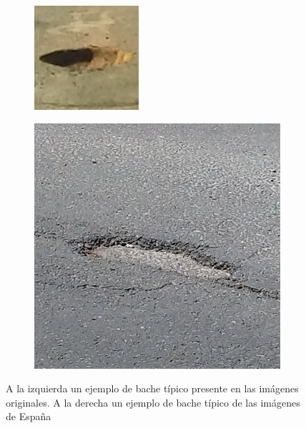 \begin{figure}[H]
	\centering
	\begin{subfigure}[h]{0.45\linewidth}
		\includegraphics[width=\linewidth]{images/pothole_diff_orig.png}
	\end{subfigure}
	\begin{subfigure}[h]{0.45\linewidth}
		\includegraphics[width=\linewidth]{images/pothole_diff_esp.png}
	\end{subfigure}
	\caption{A la izquierda un ejemplo de bache típico presente en las imágenes originales. A la derecha un ejemplo de bache típico de las imágenes de España}
	\label{fig:pothole_diffs}
\end{figure}

